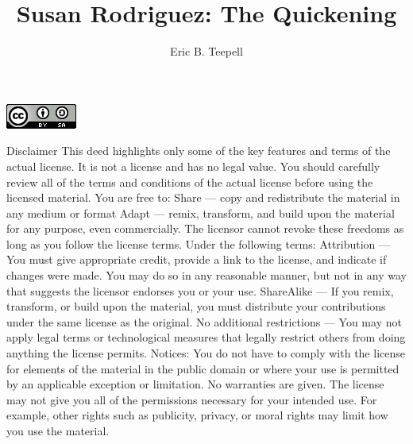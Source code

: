 \documentclass[12pt,twoside,onecolumn,openright,extrafontsizes]{memoir}
\title{Susan Rodriguez: The Quickening}
\author{Eric B. Teepell}
\newcommand{\press}{Susan's Requiem series prequel}
\newcommand*\halftitlepage{\begingroup %
  \setlength\drop{0.1\textheight}
  \begin{center}
  \vspace*{\drop}
  \rule{\textwidth}{0in}\par
  {\Large\textsc\thetitle\par}
  \rule{\textwidth}{0in}\par
  \vfill
  \end{center}
\endgroup}
\newlength\drop
\newcommand*\titleM{\begingroup %
  \setlength\drop{0.15\textheight}
  \begin{center}
  \vspace*{\drop}
  \rule{\textwidth}{0in}\par
  {\HUGE\textsc\thetitle\par}
  \rule{\textwidth}{0in}\par
  {\Large\textit\theauthor\par}
  \vfill
  {\Large\scshape\press}
  \end{center}
\endgroup}
\begin{document}
\pagestyle{empty}
\cleardoublepage
\clearpage

\begin{center}
 	\centering
	\includegraphics[width=0.25\linewidth=0.25]{license.png}
\end{center}

\newpage
{\tiny Disclaimer This deed highlights only some of the key features and terms of the actual license. It is not a license and has no legal value. You should carefully review all of the terms and conditions of the actual license before using the licensed material. You are free to: Share — copy and redistribute the material in any medium or format Adapt — remix, transform, and build upon the material
for any purpose, even commercially. The licensor cannot revoke these freedoms as long as you follow the license terms. Under the following terms: Attribution — You must give appropriate credit, provide a link to the license, and indicate if changes were made. You may do so in any reasonable manner, but not in any way that suggests the licensor endorses you or your use. ShareAlike — If you remix, transform, or build upon the material, you must distribute your contributions under the same license as the original. No additional restrictions — You may not apply legal terms or technological measures that legally restrict others from doing anything the license permits. Notices: You do not have to comply with the license for elements of the material in the public domain or where your use is permitted by an applicable exception or limitation. No warranties are given. The license may not give you all of the permissions necessary for your intended use. For example, other rights such as publicity, privacy, or moral rights may limit how you use the material.
}
\clearpage
\end{document}
